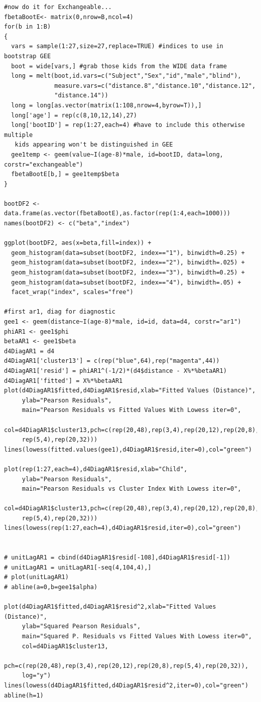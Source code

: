 \documentclass[11pt]{article}
\begin{document}
\begin{verbatim}
#now do it for Exchangeable...
fbetaBootE<- matrix(0,nrow=B,ncol=4)
for(b in 1:B)
{
  vars = sample(1:27,size=27,replace=TRUE) #indices to use in bootstrap GEE
  boot = wide[vars,] #grab those kids from the WIDE data frame
  long = melt(boot,id.vars=c("Subject","Sex","id","male","blind"),
              measure.vars=c("distance.8","distance.10","distance.12",
              "distance.14"))  
  long = long[as.vector(matrix(1:108,nrow=4,byrow=T)),]
  long['age'] = rep(c(8,10,12,14),27)
  long['bootID'] = rep(1:27,each=4) #have to include this otherwise multiple
   kids appearing won't be distinguished in GEE
  gee1temp <- geem(value~I(age-8)*male, id=bootID, data=long, corstr="exchangeable")
  fbetaBootE[b,] = gee1temp$beta
}

bootDF2 <- data.frame(as.vector(fbetaBootE),as.factor(rep(1:4,each=1000)))
names(bootDF2) <- c("beta","index")

ggplot(bootDF2, aes(x=beta,fill=index)) +
  geom_histogram(data=subset(bootDF2, index=="1"), binwidth=0.25) +
  geom_histogram(data=subset(bootDF2, index=="2"), binwidth=.025) +
  geom_histogram(data=subset(bootDF2, index=="3"), binwidth=0.25) +
  geom_histogram(data=subset(bootDF2, index=="4"), binwidth=.05) +
  facet_wrap("index", scales="free")

#first ar1, diag for diagnostic
gee1 <- geem(distance~I(age-8)*male, id=id, data=d4, corstr="ar1")
phiAR1 <- gee1$phi
betaAR1 <- gee1$beta
d4DiagAR1 = d4
d4DiagAR1['cluster13'] = c(rep("blue",64),rep("magenta",44))
d4DiagAR1['resid'] = phiAR1^(-1/2)*(d4$distance - X%*%betaAR1)
d4DiagAR1['fitted'] = X%*%betaAR1
plot(d4DiagAR1$fitted,d4DiagAR1$resid,xlab="Fitted Values (Distance)",
     ylab="Pearson Residuals", 
     main="Pearson Residuals vs Fitted Values With Lowess iter=0",
     col=d4DiagAR1$cluster13,pch=c(rep(20,48),rep(3,4),rep(20,12),rep(20,8),
     rep(5,4),rep(20,32)))
lines(lowess(fitted.values(gee1),d4DiagAR1$resid,iter=0),col="green")

plot(rep(1:27,each=4),d4DiagAR1$resid,xlab="Child",
     ylab="Pearson Residuals", 
     main="Pearson Residuals vs Cluster Index With Lowess iter=0",
     col=d4DiagAR1$cluster13,pch=c(rep(20,48),rep(3,4),rep(20,12),rep(20,8),
     rep(5,4),rep(20,32)))
lines(lowess(rep(1:27,each=4),d4DiagAR1$resid,iter=0),col="green")


# unitLagAR1 = cbind(d4DiagAR1$resid[-108],d4DiagAR1$resid[-1])
# unitLagAR1 = unitLagAR1[-seq(4,104,4),]
# plot(unitLagAR1)
# abline(a=0,b=gee1$alpha)

plot(d4DiagAR1$fitted,d4DiagAR1$resid^2,xlab="Fitted Values (Distance)",
     ylab="Squared Pearson Residuals", 
     main="Squared P. Residuals vs Fitted Values With Lowess iter=0",
     col=d4DiagAR1$cluster13,
     pch=c(rep(20,48),rep(3,4),rep(20,12),rep(20,8),rep(5,4),rep(20,32)),
     log="y")
lines(lowess(d4DiagAR1$fitted,d4DiagAR1$resid^2,iter=0),col="green")
abline(h=1)


\end{verbatim}
\end{document}
